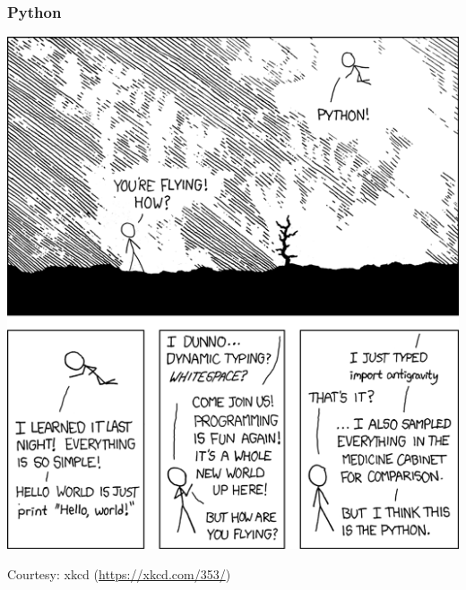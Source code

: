 \documentclass[aspectratio=169]{beamer}
\begin{document}
\begin{frame}
    \frametitle{Python}
    \centering
    \includegraphics[scale=0.3]{images/xkcd-python.png}

    {\small Courtesy: xkcd (\url{https://xkcd.com/353/})}
\end{frame}
\end{document}
